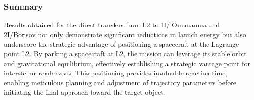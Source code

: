 \subsubsection{Summary}

Results obtained for the direct transfers from L2 to 1I/'Oumuamua and 2I/Borisov
not only demonstrate significant reductions in launch energy but also underscore
the strategic advantage of positioning a spacecraft at the Lagrange point L2. By
parking a spacecraft at L2, the mission can leverage its stable orbit and
gravitational equilibrium, effectively establishing a strategic vantage point
for interstellar rendezvous. This positioning provides invaluable reaction time,
enabling meticulous planning and adjustment of trajectory parameters before
initiating the final approach toward the target object.
